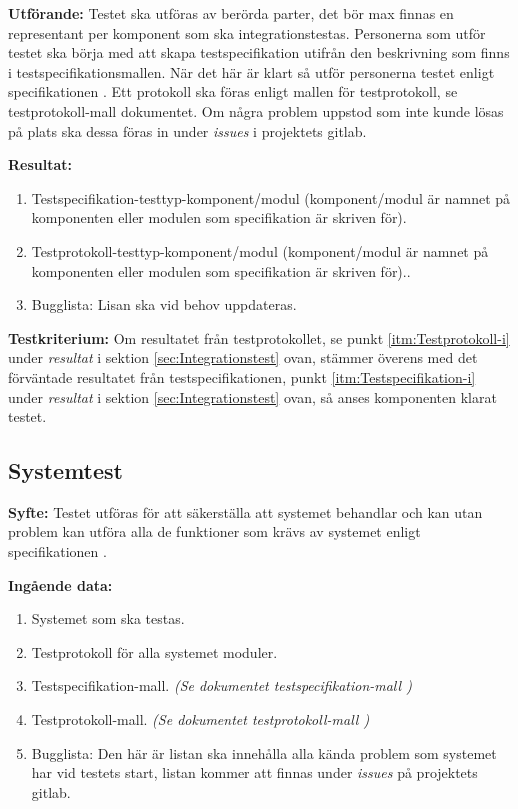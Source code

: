 \documentclass[a4paper,10pt]{article}
\begin{document}
\textbf{Utförande:} Testet ska utföras av berörda parter, det bör max finnas en representant per komponent som ska integrationstestas. Personerna som utför testet ska börja med att skapa testspecifikation utifrån den beskrivning som finns i testspecifikationsmallen. När det här är klart så utför personerna testet enligt specifikationen \cite{kravspec}. Ett protokoll ska föras enligt mallen för testprotokoll, se testprotokoll-mall dokumentet. Om några problem uppstod som inte kunde lösas på plats ska dessa föras in under \emph{issues} i projektets gitlab.

\textbf{Resultat:}
    \begin{enumerate}
        \item \label{itm:Testspecifikation-i} Testspecifikation-testtyp-komponent/modul (komponent/modul är namnet på komponenten eller modulen som specifikation är skriven för).
        \item \label{itm:Testprotokoll-i} Testprotokoll-testtyp-komponent/modul (komponent/modul är namnet på komponenten eller modulen som specifikation är skriven för)..
        \item Bugglista: Lisan ska vid behov uppdateras.
    \end{enumerate}

\textbf{Testkriterium:} Om resultatet från testprotokollet, se punkt \ref{itm:Testprotokoll-i} under \emph{resultat} i sektion \ref{sec:Integrationstest} ovan, stämmer överens med det förväntade resultatet från testspecifikationen, punkt \ref{itm:Testspecifikation-i} under \emph{resultat} i sektion \ref{sec:Integrationstest} ovan, så anses komponenten klarat testet.

\subsection{Systemtest}
\label{sec:Systemtest}
\textbf{Syfte:}
Testet utföras för att säkerställa att systemet behandlar och kan utan problem kan utföra alla de funktioner som krävs av systemet enligt specifikationen \cite{kravspec}.

\textbf{Ingående data:}
   \begin{enumerate}
       \item Systemet som ska testas.
       \item Testprotokoll för alla systemet moduler.
       \item Testspecifikation-mall. \emph{(Se dokumentet testspecifikation-mall \cite{testspec-mall})}
       \item Testprotokoll-mall. \emph{(Se dokumentet testprotokoll-mall \cite{testprot-mall})}
       \item Bugglista: Den här är listan ska innehålla alla kända problem som systemet har vid testets start, listan kommer att finnas under \emph{issues} på projektets gitlab.
   \end{enumerate}
\end{document}
